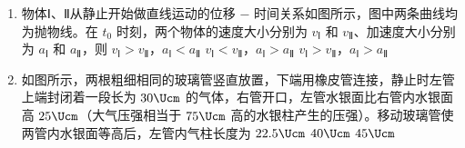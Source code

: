 \documentclass[\gkver]{gaokaozhenti}
\begin{document}
\begin{enumerate}
{由图可知，a 波的周期 $T_{a} = 1 \times 10^{-3}\Us$，b 波的周期 $T_{b} = 0.5 \times 10^{-3}\Us$，由 $f = \frac{1}{T}$ 可知 $f_{a} < f_{b}$。两列声波在空气中的传播速度 $v$ 相同，由 $\lambda = \frac{v}{f}$ 可知 $\lambda_{a} > \lambda_{b}$。

故选 D。
}

\item
物体Ⅰ、Ⅱ从静止开始做直线运动的位移 $-$ 时间关系如图所示，图中两条曲线均为抛物线。在 $t_{0}$ 时刻，两个物体的速度大小分别为 $v_{\text{Ⅰ}}$ 和 $v_{\text{Ⅱ}}$、加速度大小分别为 $a_{\text{Ⅰ}}$ 和 $a_{\text{Ⅱ}}$，则
\onepicture[w=3.2cm]{}
{$v_{\text{Ⅰ}} > v_{\text{Ⅱ}}$，$a_{\text{Ⅰ}} < a_{\text{Ⅱ}}$}
{$v_{\text{Ⅰ}} < v_{\text{Ⅱ}}$，$a_{\text{Ⅰ}} > a_{\text{Ⅱ}}$}
{$v_{\text{Ⅰ}} > v_{\text{Ⅱ}}$，$a_{\text{Ⅰ}} > a_{\text{Ⅱ}}$}

\item
如图所示，两根粗细相同的玻璃管竖直放置，下端用橡皮管连接，静止时左管上端封闭着一段长为 $30 \Ucm$ 的气体，右管开口，左管水银面比右管内水银面高 $25 \Ucm$（大气压强相当于 $75 \Ucm$ 高的水银柱产生的压强）。移动玻璃管使两管内水银面等高后，左管内气柱长度为
\onepicture[h=3.5cm]{}
\fourchoices[answer=A]
{$20 \Ucm$}
{$22.5 \Ucm$}
{$40 \Ucm$}
{$45 \Ucm$}


\end{enumerate}
\end{document}
